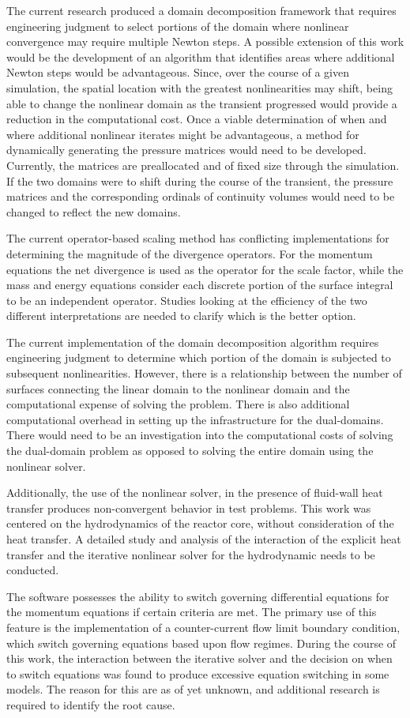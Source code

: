 The current research produced a domain decomposition framework that requires engineering judgment to select portions of the domain where nonlinear convergence may require multiple Newton steps.
A possible extension of this work would be the development of an algorithm that identifies areas where additional Newton steps would be advantageous.
Since, over the course of a given simulation, the spatial location with the greatest nonlinearities may shift, being able to change the nonlinear domain as the transient progressed would provide a reduction in the computational cost.
Once a viable determination of when and where additional nonlinear iterates might be advantageous, a method for dynamically generating the pressure matrices would need to be developed.
Currently, the matrices are preallocated and of fixed size through the simulation.
If the two domains were to shift during the course of the transient, the pressure matrices and the corresponding ordinals of continuity volumes would need to be changed to reflect the new domains.

The current operator-based scaling method has conflicting implementations for determining the magnitude of the divergence operators.
For the momentum equations the net divergence is used as the operator for the scale factor, while the mass and energy equations consider each discrete portion of the surface integral to be an independent operator.
Studies looking at the efficiency of the two different interpretations are needed to clarify which is the better option.

The current implementation of the domain decomposition algorithm requires engineering judgment to determine which portion of the domain is subjected to subsequent nonlinearities.
However, there is a relationship between the number of surfaces connecting the linear domain to the nonlinear domain and the computational expense of solving the problem.
There is also additional computational overhead in setting up the infrastructure for the dual-domains.
There would need to be an investigation into the computational costs of solving the dual-domain problem as opposed to solving the entire domain using the nonlinear solver.

Additionally, the use of the nonlinear solver, in the presence of fluid-wall heat transfer produces non-convergent behavior in test problems.
This work was centered on the hydrodynamics of the reactor core, without consideration of the heat transfer.
A detailed study and analysis of the interaction of the explicit heat transfer and the iterative nonlinear solver for the hydrodynamic needs to be conducted.

The \cobra{} software possesses the ability to switch governing differential equations for the momentum equations if certain criteria are met.
The primary use of this feature is the implementation of a counter-current flow limit boundary condition, which switch governing equations based upon flow regimes.
During the course of this work, the interaction between the iterative solver and the decision on when to switch equations was found to produce excessive equation switching in some models.
The reason for this are as of yet unknown, and additional research is required to identify the root cause.